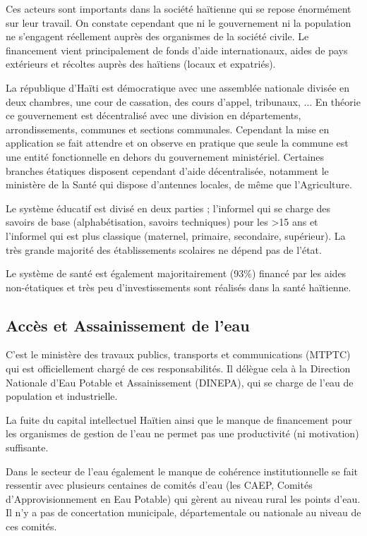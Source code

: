 \documentclass[a4paper, 11pt]{article}
\begin{document}
  Ces acteurs sont importants dans la société haïtienne qui se repose énormément sur leur travail. On constate cependant que ni le gouvernement ni la population ne s'engagent réellement auprès des organismes de la société civile. Le financement vient principalement de fonds d'aide internationaux, aides de pays extérieurs et récoltes auprès des haïtiens (locaux et expatriés).

  La république d'Haïti est démocratique avec une assemblée nationale divisée en deux chambres, une cour de cassation, des cours d'appel, tribunaux, ... En théorie ce gouvernement est décentralisé avec une division en départements, arrondissements, communes et sections communales. Cependant la mise en application se fait attendre et on observe en pratique que seule la commune est une entité fonctionnelle en dehors du gouvernement ministériel. Certaines branches étatiques disposent cependant d'aide décentralisée, notamment le ministère de la Santé qui dispose d'antennes locales, de même que l'Agriculture.

  Le système éducatif est divisé en deux parties ; l'informel qui se charge des savoirs de base (alphabétisation, savoirs techniques) pour les >15 ans et l'informel qui est plus classique (maternel, primaire, secondaire, supérieur). La très grande majorité des établissements scolaires ne dépend pas de l'état.

  Le système de santé est également majoritairement (93\%) financé par les aides non-étatiques et très peu d'investissements sont réalisés dans la santé haïtienne.

  \subsection*{Accès et Assainissement de l'eau}
  C'est le ministère des travaux publics, transports et communications (MTPTC) qui est officiellement chargé de ces responsabilités. Il délègue cela à la Direction Nationale d'Eau Potable et Assainissement (DINEPA), qui se charge de l'eau de population et industrielle.

  La fuite du capital intellectuel Haïtien ainsi que le manque de financement pour les organismes de gestion de l'eau ne permet pas une productivité (ni motivation) suffisante.

  Dans le secteur de l'eau également le manque de cohérence institutionnelle se fait ressentir avec plusieurs centaines de comités d'eau (les CAEP, Comités d'Approvisionnement en Eau Potable) qui gèrent au niveau rural les points d'eau. Il n'y a pas de concertation municipale, départementale ou nationale au niveau de ces comités.
\end{document}
